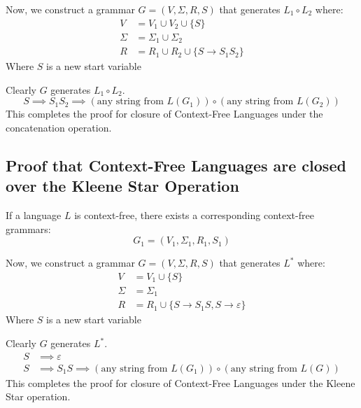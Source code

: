 \documentclass[11pt]{article}
\begin{document}
Now, we construct a grammar $G=(V,\Sigma,R,S)$ that generates $L_1 \circ L_2$
where:
\begin{align*}
	V &= V_1 \cup V_2 \cup \{S\} \\
	\Sigma &= \Sigma_1 \cup \Sigma_2 \\
	R &= R_1 \cup R_2 \cup \{S \to S_1S_2 \}
\end{align*}
Where $S$ is a new start variable

Clearly $G$ generates $L_1 \circ L_2$.
$$S \implies S_1S_2 \implies (\text{any string from }L(G_1)) \circ (\text{any
string from }L(G_2))$$
This completes the proof for closure of Context-Free Languages under the
concatenation operation.

\newpage
\subsection{Proof that Context-Free Languages are closed over the Kleene Star
Operation}
If a language $L$ is context-free, there exists a corresponding	
context-free grammars:
$$G_1 = (V_1,\Sigma_1, R_1,S_1)$$

Now, we construct a grammar $G=(V,\Sigma,R,S)$ that generates $L^\ast$
where:
\begin{align*}
	V &= V_1 \cup \{S\} \\
	\Sigma &= \Sigma_1 \\
	R &= R_1 \cup \{S \to S_1S, S \to \varepsilon \}
\end{align*}
Where $S$ is a new start variable

Clearly $G$ generates $L^\ast$.
\begin{align*}
	S & \implies \varepsilon \\
	S & \implies S_1S \implies (\text{any string from }L(G_1))	\circ (\text{any
string from }L(G))
\end{align*}
This completes the proof for closure of Context-Free Languages under the
Kleene Star operation.
\end{document}
